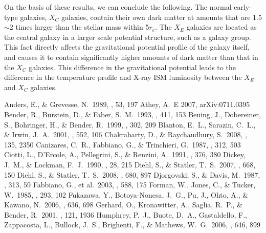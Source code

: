 \documentclass[structabstract]{aa}
\begin{document}
On the basis of these results, we can conclude the following. The
normal early-type galaxies, $X_C$ galaxies, contain their own dark
matter at amounts that are 1.5$\sim$2 times larger than the stellar
mass within 5$r_e$. The $X_E$ galaxies are located as the central galaxy in
a larger scale potential structure, such as a galaxy group. This fact
directly affects the gravitational potential profile of the galaxy
itself, and causes it to contain significantly higher amounts of dark
matter than that in the $X_C$ galaxies. This difference in the
gravitational potential leads to the difference in the temperature
profile and X-ray ISM luminosity between the $X_E$ and $X_C$ galaxies.

\begin{thebibliography}{}

 Anders, E., \& Grevesse, N.\ 1989, \gca, 53, 197
 Athey, A.~E 2007, arXiv:0711.0395 
 Bender, R., Burstein, D., \& Faber, S.~M.\ 1993, \apj, 411, 153
 Beuing, J., Dobereiner, S., Bohringer, H., \& Bender, R.\ 1999, \mnras, 302, 209 
 Blanton, E.~L., Sarazin, C.~L., \& Irwin, J.~A.\ 2001, \apj, 552, 106 
 Chakrabarty, D., \& Raychaudhury, S.\ 2008, \aj, 135, 2350
 Canizares, C.~R., Fabbiano, G., \& Trinchieri, G.\ 1987, \apj, 312, 503 
 Ciotti, L., D'Ercole, A., Pellegrini, S., \& Renzini, A.\ 1991, \apj, 376, 380
 Dickey, J.~M., \& Lockman, F.~J.\ 1990, \araa, 28, 215
 Diehl, S., \& Statler, T.~S.\ 2007, \apj, 668, 150  
 Diehl, S., \& Statler, T.~S.\ 2008, \apj, 680, 897 
 Djorgovski, S., \& Davis, M.\ 1987, \apj, 313, 59
 Fabbiano, G., et al.\ 2003, \apj, 588, 175 
 Forman, W., Jones, C., \& Tucker, W.\ 1985, \apj, 293, 102
 Fukazawa, Y., Botoya-Nonesa, J.~G., Pu, J., Ohto, A., \& Kawano, N.\ 2006, \apj, 636, 698
 Gerhard, O., Kronawitter, A., Saglia, R.~P., \& Bender, R.\ 2001, \aj, 121, 1936
 Humphrey, P.~J., Buote, D.~A., Gastaldello, F., Zappacosta, L., Bullock, J.~S., Brighenti, F., \& Mathews, W.~G.\ 2006, \apj, 646, 899

\end{thebibliography}
\end{document}
